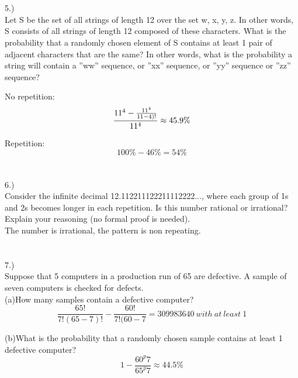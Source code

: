 \documentclass[fleqn]{article}
\begin{document}
\section*{}
5.)\\
Let S be the set of all strings of length 12 over the set {w, x, y, z}. 
In other words, S consists of all strings of
length 12 composed of these characters. What is the probability that 
a randomly chosen element of S contains at least 1 pair of adjacent 
characters that are the same? In other words, what is the probability a
string will contain a ”ww” sequence, or ”xx” sequence, or
”yy” sequence or ”zz” sequence?

No repetition:
\begin{equation*}
  \frac{11^4 - \frac{11^4}{11-4)!}}{11^4} \approx 45.9\% \\
\end{equation*}

Repetition:\\

\begin{equation*}
  100\%-46\%=54\%
\end{equation*}


 \section*{}
 6.) \\
Consider the infinite decimal 12.112211122211112222..., where each group 
of 1s and 2s becomes longer in each repetition. Is this number rational
or irrational? Explain your reasoning (no formal proof is needed).
\\
The number is irrational, the pattern is non repeating.

\section*{}
7.)\\
Suppose that 5 computers in a production run of 65 are defective. A sample of
seven computers is checked for defects.\\
(a)How many samples contain a defective computer?
\begin{equation*} 
  \frac{65!}{7!(65-7)!} - \frac{60!}{7!(60-7}=309983640~with~at~least~1 
\end{equation*}

(b)What is the probability that a randomly chosen sample contains at least 1 
defective  computer?
\begin{equation*}  
  1-\frac{60^p7}{65^p7} \approx 44.5\%
\end{equation*}
 
\end{document}
